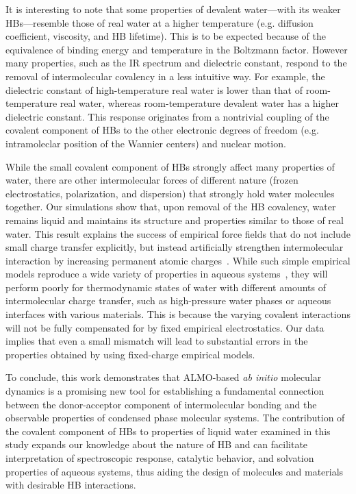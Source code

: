 \documentclass[journal=jacsat,manuscript=article]{achemso}
\begin{document}
It is interesting to note that some properties of devalent water---with its weaker HBs---resemble those of real water at a higher temperature (e.g. diffusion coefficient, viscosity, and HB lifetime). 
This is to be expected because of the equivalence of binding energy and temperature in the Boltzmann factor. However many properties, such as the IR spectrum and dielectric constant, respond to the removal of intermolecular covalency in a less intuitive way. 
For example, the dielectric constant of high-temperature real water is lower than that of room-temperature real water, whereas room-temperature devalent water has a higher dielectric constant. 
This response originates from a nontrivial coupling of the covalent component of HBs to the other electronic degrees of freedom (e.g. intramoleclar position of the Wannier centers) and nuclear motion.

While the small covalent component of HBs strongly affect many properties of water, there are other intermolecular forces of different nature (frozen electrostatics, polarization, and dispersion) that strongly hold water molecules together. 
Our simulations show that, upon removal of the HB covalency, water remains liquid and maintains its structure and properties similar to those of real water. 
This result explains the success of empirical force fields that do not include small charge transfer explicitly, but instead artificially strengthen intermolecular interaction by increasing permanent atomic charges~\cite{rick2016polarizable}. 
While such simple empirical models reproduce a wide variety of properties in aqueous systems~\cite{vega2011simulating}, they will perform poorly for thermodynamic states of water with different amounts of intermolecular charge transfer, such as high-pressure water phases or aqueous interfaces with various materials. 
This is because the varying covalent interactions will not be fully compensated for by fixed empirical electrostatics.
Our data implies that even a small mismatch will lead to substantial errors in the properties obtained by using fixed-charge empirical models.

To conclude, this work demonstrates that ALMO-based \emph{ab initio} molecular dynamics is a promising new tool for establishing a fundamental connection between the donor-acceptor component of intermolecular bonding and the observable properties of condensed phase molecular systems. 
The contribution of the covalent component of HBs to properties of liquid water examined in this study expands our knowledge about the nature of HB and can facilitate interpretation of spectroscopic response, catalytic behavior, and solvation properties of aqueous systems, thus aiding the design of molecules and materials with desirable HB interactions. 
 
\end{document}
